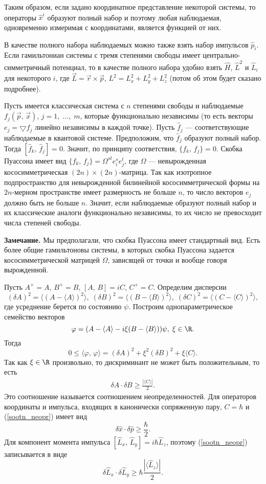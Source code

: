 \documentclass[a4paper
]{article}
\begin{document}
Таким образом, если задано координатное представление некоторой системы,
то операторы $\hat{x}^i$ образуют полный набор и поэтому любая
наблюдаемая, одновременно измеримая с координатами, является функцией от них. \par
В качестве полного набора наблюдаемых можно также взять набор
импульсов $\hat{p}_i$. Если гамильтониан системы с тремя степенями
свободы имеет центрально-симметричный потенциал, то в качестве полного
набора удобно взять $\hat{H}$, $\hat{L}^2$ и $\hat{L}_i$ для некоторого
$i$, где $\vec{L}=\vec{r}\times \vec{p}$, $L^2=L_x^2+L_y^2+L_z^2$
(потом об этом будет сказано подробнее). \par
Пусть имеется классическая система с $n$ степенями свободы и наблюдаемые
$f_j(\vec{p}, \, \vec{x})$, $j=1, \; \dots, \; m$, которые
функционально независимы (то есть векторы $e_j=\bigtriangledown f_j$ линейно
независимы в каждой точке). Пусть $\hat{f}_j$ --- соответствующие
наблюдаемые в квантовой системе. Предположим, что $\hat{f}_j$
образуют полный набор. Тогда $[\hat{f}_k, \, \hat{f}_j]=0$. Значит,
по принципу соответствия, $\{f_k, \, f_j\}=0$. Скобка Пуассона имеет вид
$\{f_k, \, f_j\}=\Omega^{st}e^s_ie^t_j$, где $\Omega$ --- невырожденная
кососимметрическая $(2n)\times(2n)$-матрица. Так как изотропное
подпространство для невырожденной билинейной кососимметрической формы
на $2n$-мерном пространстве имеет размерность не больше $n$, то
число векторов $e_j$ должно быть не больше $n$. Значит, если наблюдаемые
образуют полный набор и их классические аналоги функционально независимы,
то их число не превосходит числа степеней свободы. \par
{\bf Замечание.} Мы предполагали, что скобка Пуассона имеет стандартный
вид. Есть более общие гамильтоновы системы, в которых скобка Пуассона
задается кососимметрической матрицей $\Omega$, зависящей от точки и
вообще говоря вырожденной. \par
Пусть $A^+=A$, $B^+=B$, $[A, \, B]=iC$, $C^+=C$. Определим дисперсии
$$(\delta A)^2=\langle (A-\langle A\rangle)^2\rangle , \; (\delta B)^2=
\langle (B-\langle B\rangle)^2\rangle, \; (\delta C)^2=\langle (C-
\langle C\rangle)^2\rangle,$$ где усреднение берется по состоянию
$\psi$. Построим однопараметрическое семейство векторов
$$\varphi =(A-\langle A\rangle-i\xi(B-\langle B\rangle))
\psi , \; \xi\in \R.$$ Тогда
$$0\le \langle\varphi , \, \varphi\rangle=(\delta A)^2+\xi^2(\delta B)^2
+\xi \langle C\rangle.$$ Так как $\xi\in \R$ произвольно, то
дискриминант не может быть положительным, то есть
\begin{align}
\label{sootn_neopr}
\delta A\cdot \delta B\ge \frac{|\langle C\rangle|}{2}.
\end{align}
Это соотношение называется соотношением неопределенностей. Для операторов
координаты и импульса, входящих в канонически сопряженную пару, $C=
\hbar$ и (\ref{sootn_neopr}) имеет вид
$$\delta \hat{x}\cdot\delta \hat{p}\ge \frac{\hbar}{2}.$$
Для компонент момента импульса $[\hat{L}_x, \, \hat{L}_y]=i\hbar \hat{L}_z$, поэтому
(\ref{sootn_neopr}) записывается в виде
$$\delta \hat{L}_x\cdot \delta \hat{L}_y\ge \hbar \frac{|\langle \hat{L}_z
\rangle|}{2}.$$
\end{document}
